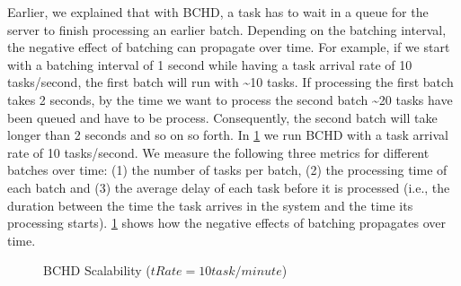 Earlier, we explained that with BCHD, a task has to wait in a queue for the server to finish processing an earlier batch. Depending on the batching interval, the negative effect of batching can propagate over time. For example, if we start with a batching interval of 1 second while having a task arrival rate of 10 tasks/second, the first batch will run with \textasciitilde 10 tasks. If processing the first batch takes 2 seconds, by the time we want to process the second batch \textasciitilde 20 tasks have been queued and have to be process. Consequently, the second batch will take longer than 2 seconds and so on so forth. In \cref{fig:bs} we run BCHD with a task arrival rate of 10 tasks/second. We measure the following three metrics for different batches over time: (1) the number of tasks per batch, (2) the processing time of each batch and (3) the average delay of each task before it is processed (i.e., the duration between the time the task arrives in the system and the time its processing starts). \cref{fig:bs} shows how the negative effects of batching propagates over time.\\

\begin{figure}[h]
    \centering
    \vspace{-0.15in}
    \caption{BCHD Scalability ($tRate = 10 task/minute$)}
    \label{fig:bs}
\end{figure}

